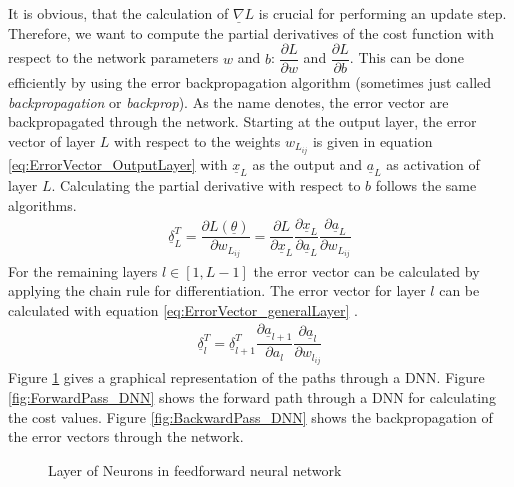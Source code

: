 \documentclass[12pt,DIV14,BCOR12mm,a4paper,footexclude,headinclude,halfparskip-,twoside,openright,openany,cleardoubleempty,idxtotoc,bibtotoc]{scrreprt} %
\numberwithin{equation}{chapter}
\begin{document}
It is obvious, that the calculation of $\underline{\nabla}L$ is crucial for performing an update step. Therefore, we want to compute the partial derivatives of the cost function with respect to the network parameters $w$ and $b$: $\dfrac{\partial L}{\partial w}$ and $\dfrac{\partial L}{\partial b}$. This can be done efficiently by using the error backpropagation algorithm (sometimes just called \textit{backpropagation} or \textit{backprop}). As the name denotes, the error vector are backpropagated through the network. Starting at the output layer, the  error vector of layer $L$ with respect to the weights $w_{L_{ij}}$ is given in equation \ref{eq:ErrorVector_OutputLayer} with $\underline{x}_{L}$ as the output and $\underline{a}_{L}$ as activation of layer $L$. Calculating the partial derivative with respect to $b$ follows the same algorithms.
\begin{align}
	\underline{\delta}_{L}^{T} = \dfrac{\partial L(\underline{\theta})}{\partial w_{L_{ij}}} = \dfrac{\partial L}{\partial \underline{x}_{L}}\dfrac{\partial \underline{x}_{L}}{\partial \underline{a}_{L}}\dfrac{\partial \underline{a}_{L}}{\partial w_{L_{ij}}}\label{eq:ErrorVector_OutputLayer}
\end{align}
For the remaining layers $l \in [1, L-1]$ the error vector can be calculated by applying the chain rule for differentiation. The error vector for layer $l$ can be calculated with equation \ref{eq:ErrorVector_generalLayer} \cite{LectureNotes_DeepLearning}.
\begin{align}
	\underline{\delta}_{l}^{T} = \underline{\delta}_{l+1}^{T}\dfrac{\partial \underline{a}_{l+1}}{\partial a_{l}}\dfrac{\partial \underline{a}_{l}}{\partial w_{l_{ij}}}\label{eq:ErrorVector_generalLayer}
\end{align}
Figure \ref{fig:Backprop_DNN} gives a graphical representation of the paths through a DNN. Figure \ref{fig:ForwardPass_DNN} shows the forward path through a DNN for calculating the cost values. Figure \ref{fig:BackwardPass_DNN} shows the backpropagation of the error vectors through the network.
\begin{figure}[htb!]
	\centering
	\qquad
	\caption{Layer of Neurons in feedforward neural network}
	\label{fig:Backprop_DNN}
\end{figure}
\end{document}
